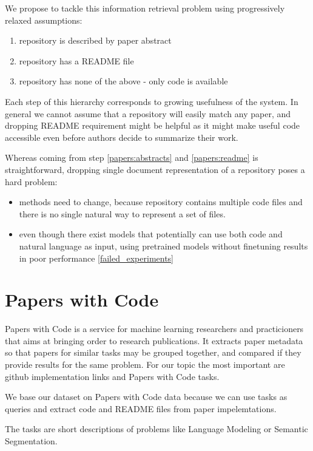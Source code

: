 \documentclass[longabstract,mgr,english]{iithesis}
\begin{document}
We propose to tackle this information retrieval problem using progressively
relaxed  
assumptions: 

\begin{enumerate}
\item repository \label{papers:abstracts} is described by paper abstract
\item repository \label{papers:readme} has a README file
\item repository \label{papers:code} has none of the above - only code is available 
\end{enumerate}

Each step of this hierarchy corresponds to growing usefulness of the system. In
general we cannot assume that a repository will easily match any paper, and
dropping README requirement might be helpful as it might make useful code
accessible even before authors decide to summarize their work.

Whereas coming from step \ref{papers:abstracts} and \ref{papers:readme} is
straightforward, dropping single document representation of a repository poses a
hard problem:

\begin{itemize}
\item methods need to change, because repository contains multiple code files
  and there is no single natural way to represent a set of files.
\item even though there exist models that potentially can use both code  and
  natural language as input, using pretrained models without finetuning results
  in poor performance \ref{failed_experiments} 
\end{itemize}

\section{Papers with Code}

Papers with Code is a service for machine learning researchers and practicioners
that aims at bringing order to research publications. It extracts paper metadata
so that papers for similar tasks may be grouped together, and compared if they
provide results for the same problem. For our topic the most important are
github implementation links and Papers with Code tasks.

We base our dataset on Papers with Code data because we can use tasks as queries
and extract code and
README files from paper impelemtations.

The tasks are short descriptions of problems like Language Modeling or Semantic Segmentation.
\end{document}
